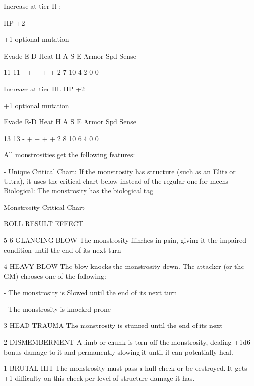 Increase at tier II :
 
HP +2
 
+1 optional mutation
 

         Evade    E-D     Heat    H   A   S    E   Armor     Spd       Sense 

         11       11      -       +   +   +    +   2         7         10 
                                  4   2   0    0 

Increase at tier III:  
HP +2
 
+1 optional mutation
 

         Evade    E-D     Heat    H   A   S    E   Armor     Spd       Sense 

         13       13      -       +   +   +    +   2         8         10 
                                  6   4   0    0 

All monstrosities get the following features:
 
    -    Unique Critical Chart: If the monstrosity has structure (such as an Elite or Ultra), it uses  
         the critical chart below instead of the regular one for mechs  
    -    Biological: The monstrosity has the biological tag  

                                          Monstrosity Critical Chart  

 ROLL       RESULT                   EFFECT 

 5-6         GLANCING BLOW           The monstrosity flinches in pain, giving it the impaired condition until  
                                     the end of its next turn 

 4           HEAVY BLOW              The blow knocks the monstrosity down. The attacker (or the GM)  
                                     chooses one of the following:
 
                                         -   The monstrosity is Slowed until the end of its next turn
 
                                         -   The monstrosity is knocked prone 

 3           HEAD TRAUMA             The monstrosity is stunned until the end of its next 

 2           DISMEMBERMENT           A limb or chunk is torn off the monstrosity, dealing +1d6 bonus damage  
                                     to it and permanently slowing it until it can potentially heal. 

 1           BRUTAL HIT              The monstrosity must pass a hull check or be destroyed. It gets +1  
                                     difficulty on this check per level of structure damage it has. 

